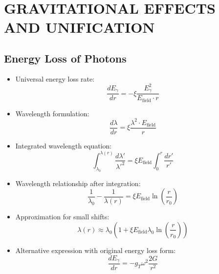 \documentclass[12pt,a4paper]{article}
\begin{document}
	\section{GRAVITATIONAL EFFECTS AND UNIFICATION}
	
	\subsection{Energy Loss of Photons}
	\begin{itemize}
		\item Universal energy loss rate:
		$$\boxed{\frac{dE_\gamma}{dr} = -\xi \frac{E_\gamma^2}{E_{\text{field}} \cdot r}}$$
		
		\item Wavelength formulation:
		$$\frac{d\lambda}{dr} = \xi \frac{\lambda^2 \cdot E_{\text{field}}}{r}$$
		
		\item Integrated wavelength equation:
		$$\int_{\lambda_0}^{\lambda(r)} \frac{d\lambda'}{\lambda'^2} = \xi E_{\text{field}} \int_0^r \frac{dr'}{r'}$$
		
		\item Wavelength relationship after integration:
		$$\frac{1}{\lambda_0} - \frac{1}{\lambda(r)} = \xi E_{\text{field}} \ln\left(\frac{r}{r_0}\right)$$
		
		\item Approximation for small shifts:
		$$\lambda(r) \approx \lambda_0 \left(1 + \xi E_{\text{field}} \lambda_0 \ln\left(\frac{r}{r_0}\right)\right)$$
		
		\item Alternative expression with original energy loss form:
		$$\frac{dE_\gamma}{dr} = -g_T \omega^2 \frac{2G}{r^2}$$
	\end{itemize}
	
\end{document}
